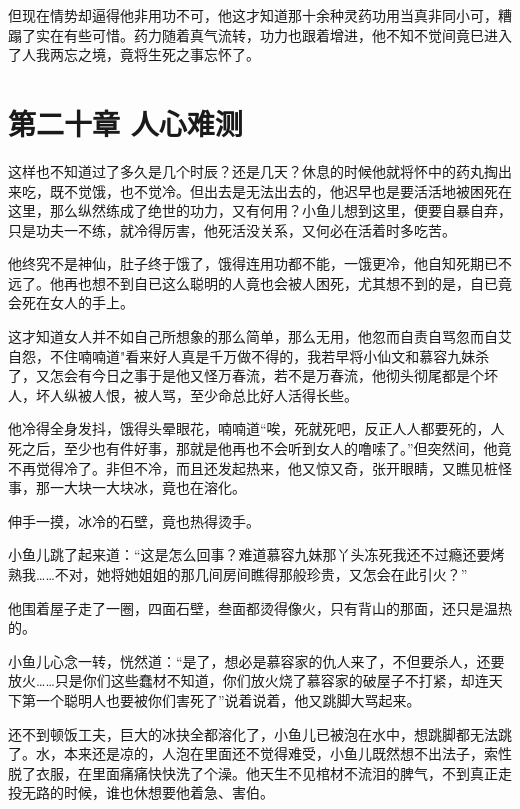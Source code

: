 \documentclass[12pt,oneside]{book}
\begin{document}
但现在情势却逼得他非用功不可，他这才知道那十余种灵药功用当真非同小可，糟蹋了实在有些可惜。药力随着真气流转，功力也跟着增进，他不知不觉间竟巳进入了人我两忘之境，竟将生死之事忘怀了。

\hypertarget{ux7b2cux4e8cux5341ux7ae0-ux4ebaux5fc3ux96beux6d4b}{%
\chapter{第二十章
人心难测}\label{ux7b2cux4e8cux5341ux7ae0-ux4ebaux5fc3ux96beux6d4b}}

这样也不知道过了多久是几个时辰？还是几天？休息的时候他就将怀中的药丸掏出来吃，既不觉饿，也不觉冷。但出去是无法出去的，他迟早也是要活活地被困死在这里，那么纵然练成了绝世的功力，又有何用？小鱼儿想到这里，便要自暴自弃，只是功夫一不练，就冷得厉害，他死活没关系，又何必在活着时多吃苦。

他终究不是神仙，肚子终于饿了，饿得连用功都不能，一饿更冷，他自知死期已不远了。他再也想不到自已这么聪明的人竟也会被人困死，尤其想不到的是，自已竟会死在女人的手上。

这才知道女人并不如自己所想象的那么简单，那么无用，他忽而自责自骂忽而自艾自怨，不住喃喃道"看来好人真是千万做不得的，我若早将小仙文和慕容九妹杀了，又怎会有今日之事于是他又怪万春流，若不是万春流，他彻头彻尾都是个坏人，坏人纵被人恨，被人骂，至少命总比好人活得长些。

他冷得全身发抖，饿得头晕眼花，喃喃道``唉，死就死吧，反正人人都要死的，人死之后，至少也有件好事，那就是他再也不会听到女人的噜嗦了。''但突然间，他竟不再觉得冷了。非但不冷，而且还发起热来，他又惊又奇，张开眼睛，又瞧见桩怪事，那一大块一大块冰，竟也在溶化。

伸手一摸，冰冷的石壁，竟也热得烫手。

小鱼儿跳了起来道：``这是怎么回事？难道慕容九妹那丫头冻死我还不过瘾还要烤熟我\ldots\ldots 不对，她将她姐姐的那几间房间瞧得那般珍贵，又怎会在此引火？''

他围着屋子走了一圈，四面石壁，叁面都烫得像火，只有背山的那面，还只是温热的。

小鱼儿心念一转，恍然道：``是了，想必是慕容家的仇人来了，不但要杀人，还要放火\ldots\ldots 只是你们这些蠢材不知道，你们放火烧了慕容家的破屋子不打紧，却连天下第一个聪明人也要被你们害死了''说着说着，他又跳脚大骂起来。

还不到顿饭工夫，巨大的冰抉全都溶化了，小鱼儿已被泡在水中，想跳脚都无法跳了。水，本来还是凉的，人泡在里面还不觉得难受，小鱼儿既然想不出法子，索性脱了衣服，在里面痛痛快快洗了个澡。他天生不见棺材不流泪的脾气，不到真正走投无路的时候，谁也休想要他着急、害伯。
\end{document}
